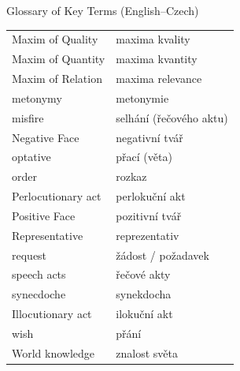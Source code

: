 \documentclass{beamer}
\begin{document}
\begin{frame}[allowframebreaks]{Glossary of Key Terms (English--Czech)}
\begin{longtable}{ll}
Maxim of Quality & maxima kvality \\
Maxim of Quantity & maxima kvantity \\
Maxim of Relation & maxima relevance \\
metonymy & metonymie \\
misfire & selhání (řečového aktu) \\
Negative Face & negativní tvář \\
optative & přací (věta) \\
order & rozkaz \\
Perlocutionary act & perlokuční akt \\
Positive Face & pozitivní tvář \\
Representative & reprezentativ \\
request & žádost / požadavek \\
speech acts & řečové akty \\
synecdoche & synekdocha \\
Illocutionary act & ilokuční akt \\
wish & přání \\
World knowledge & znalost světa \\
\end{longtable}

\end{frame}
\end{document}
